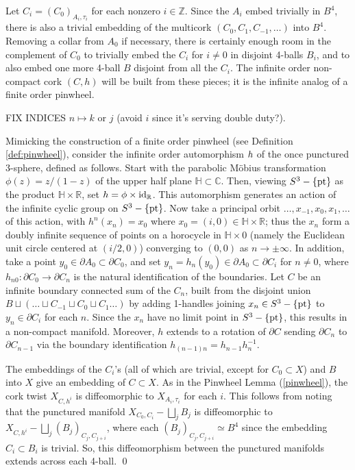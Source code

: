 \documentclass[11pt]{amsart}
\theoremstyle{definition}
\newcommand{\bc}{\mathbb C}
\newcommand{\bh}{\mathbb H}
\newcommand{\br}{\mathbb R}
\newcommand{\bz}{\mathbb Z}
\newcommand{\id}{\textup{id}}
\newcommand{\pt}{\textup{pt}}
\newcommand{\del}{\partial}
\begin{document}
Let $C_i= (C_0)_{A_i, \tau_i}$ for each nonzero $i\in\bz$.  Since the $A_i$ embed trivially in $B^4$, there is also a trivial embedding of the multicork $(C_0, C_1, C_{-1}, \dots)$ into $B^4$. Removing a collar from $A_0$ if necessary, there is certainly enough room in the complement of $C_0$ to trivially embed the $C_i$ for $i\ne0$ in disjoint 4-balls $B_i$, and to also embed one more 4-ball $B$ disjoint from all the $C_i$. The infinite order non-compact cork $(C,h)$ will be built from these pieces; it is the infinite analog of a finite order pinwheel. 

FIX INDICES $n\mapsto k$ or $j$ (avoid $i$ since it's serving double duty?).  

Mimicking the construction of a finite order pinwheel (see Definition \ref{def:pinwheel}), consider the infinite order automorphism $h$ of the once punctured 3-sphere, defined as follows. Start with the parabolic M{\"o}bius  transformation $\phi(z)= {z}/{(1-z)}$ of the upper half plane $\bh \subset \bc$. Then, viewing $S^3 - \{\pt\}$ as the product $\bh \times \br$, set $\rot = \phi \times \id_{\br}$.  This automorphism generates an action of the infinite cyclic group on $S^3 - \{\pt\}$.  Now take a principal orbit $\dots, x_{-1}, x_0,x_1, \dots $ of this action, with $h^{n}(x_n)=x_0$ where $x_0= (i,0) \in \bh \times \br$; thus the $x_n$ form a doubly infinite sequence of points on a horocycle in $\bh\times 0$ (namely the Euclidean unit circle centered at $(i/2,0)$) converging to $(0,0)$ as $n\to\pm\infty$.  In addition, take a point $y_0\in\del A_0 \subset \del C_0$, and set $y_n= h_n(y_0)\in \del A_0 \subset \del C_i$ for $n\not=0$, where $h_{n0}\colon\del C_0\to \del C_n$ is the natural identification of the boundaries. Let $C$ be an infinite boundary connected sum of the $C_n$, built from the disjoint union $B \sqcup (\dots \sqcup C_{-1} \sqcup C_0 \sqcup C_1 \dots)$  by adding 1-handles joining $x_n\in S^3-\{\pt\}$ to $y_n\in \del C_i$ for each $n$. Since the $x_n$ have no limit point in $S^3-\{\pt\}$, this results in a non-compact manifold. Moreover, $h$ extends to a rotation of $\del C$ sending $\del C_n$ to $\del C_{n-1}$ via the boundary identification $h_{(n-1)n} = h_{n-1}h_n^{-1}$. 

The embeddings of the $C_i$'s (all of which are trivial, except for $C_0 \subset X$) and $B$ into $X$ give an embedding of $C \subset X$. As in the Pinwheel Lemma (\ref{pinwheel}), the cork twist $X_{C,h^i}$ is diffeomorphic to $ X_{A_i, \tau_i}$ for each $i$. This follows from noting that the punctured manifold $X_{C_0, C_i}- \bigsqcup_j B_j$ is diffeomorphic to $ X_{C,h^i}- \bigsqcup_j (B_j)_{C_j, C_{j+i}}$, where each $(B_j)_{C_j, C_{j+i}} \simeq B^4$ since the embedding $C_i \subset B_i$ is trivial. So, this diffeomorphism between the punctured manifolds extends across each 4-ball. \qed
\end{document}
